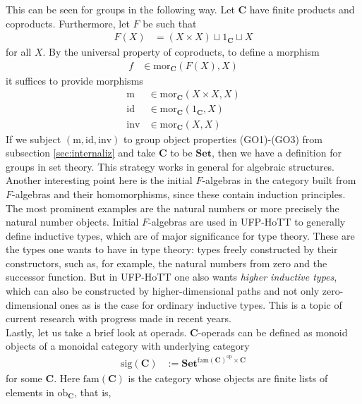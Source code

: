 This can be seen for groups in the following way.
Let $\mathbf{C}$ have finite products and coproducts.
Furthermore, let $F$ be such that
\begin{align*}
  F(X)
  &=
  \left(
    X
    \times
    X
  \right)
  \sqcup
  1_{\mathbf{C}}
  \sqcup
  X
\end{align*}
for all $X$.
By the universal property of coproducts, to define a morphism
\begin{align*}
  f
  &\in
  \mathrm{mor}_{\mathbf{C}}(F(X),X)
\end{align*}
it suffices to provide morphisms
\begin{align*}
  \mathrm{m}
  &\in
  \mathrm{mor}_{\mathbf{C}}(X \times X,X)
  \\
  \mathrm{id}
  &\in
  \mathrm{mor}_{\mathbf{C}}(1_{\mathbf{C}},X)
  \\
  \mathrm{inv}
  &\in
  \mathrm{mor}_{\mathbf{C}}(X,X)
\end{align*}
If we subject $(\mathrm{m},\mathrm{id},\mathrm{inv})$ to group object properties (GO1)-(GO3) from subsection \ref{sec:internaliz} and take $\mathbf{C}$ to be $\mathbf{Set}$, then we have a definition for groups in set theory.
This strategy works in general for algebraic structures.
Another interesting point here is the initial $F$-algebras in the category built from $F$-algebras and their homomorphisms, since these contain induction principles.
The most prominent examples are the natural numbers or more precisely the natural number objects.
Initial $F$-algebras are used in UFP-HoTT to generally define inductive types, which are of major significance for type theory.
These are the types one wants to have in type theory: types freely constructed by their constructors, such as, for example, the natural numbers from zero and the successor function.
But in UFP-HoTT one also wants \textit{higher inductive types}, which can also be constructed by higher-dimensional paths and not only zero-dimensional ones as is the case for ordinary inductive types.
This is a topic of current research with progress made in recent years.
\\
Lastly, let us take a brief look at operads.
$\mathbf{C}$-operads can be defined as monoid objects of a monoidal category with underlying category
\begin{align*}
  \mathrm{sig}(\mathbf{C})
  &:=
  \mathbf{Set}^{\mathrm{fam}(\mathbf{C})^{\mathrm{op}} \times \mathbf{C}}
\end{align*}
for some $\mathbf{C}$.
Here $\mathrm{fam}(\mathbf{C})$ is the category whose objects are finite lists of elements in $\mathrm{ob}_{\mathbf{C}}$, that is,
